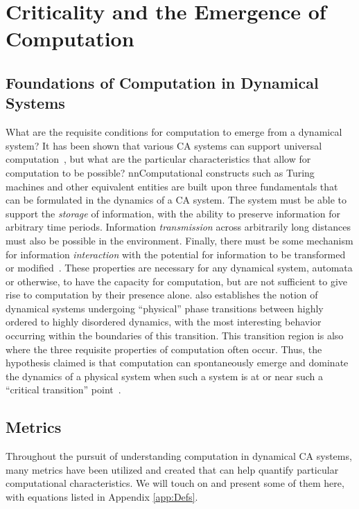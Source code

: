\documentclass[a4paper,11pt]{report}
\begin{document}
\section{Criticality and the Emergence of Computation}
\label{sec:Crit}

\subsection{Foundations of Computation in Dynamical Systems}

What are the requisite conditions for computation to emerge from a dynamical system?
It has been shown that various CA systems can support universal computation~\cite{wf86}, but what are the particular characteristics that allow for computation to be possible?
nnComputational constructs such as Turing machines and other equivalent entities are built upon three fundamentals that can be formulated in the dynamics of a CA system. The system must be able to support the \textit{storage} of information, with the ability to preserve information for arbitrary time periods. Information \textit{transmission} across arbitrarily long distances must also be possible in the environment. Finally, there must be some mechanism for information \textit{interaction} with the potential for information to be transformed or modified~\cite{la90}. These properties are necessary for any dynamical system, automata or otherwise, to have the capacity for computation, but are not sufficient to give rise to computation by their presence alone.
\citeauthor{la90} also establishes the notion of dynamical systems undergoing ``physical'' phase transitions between highly ordered to highly disordered dynamics, with the most interesting behavior occurring within the boundaries of this transition. This transition region is also where the three requisite properties of computation often occur. Thus, the hypothesis \citeauthor{la90} claimed is that computation can spontaneously emerge and dominate the dynamics of a physical system when such a system is at or near such a ``critical transition'' point~\cite{la90}. 

\subsection{Metrics}

Throughout the pursuit of understanding computation in dynamical CA systems, many metrics have been utilized and created that can help quantify particular computational characteristics. We will touch on and present some of them here, with equations listed in Appendix \ref{app:Defs}.
\end{document}
